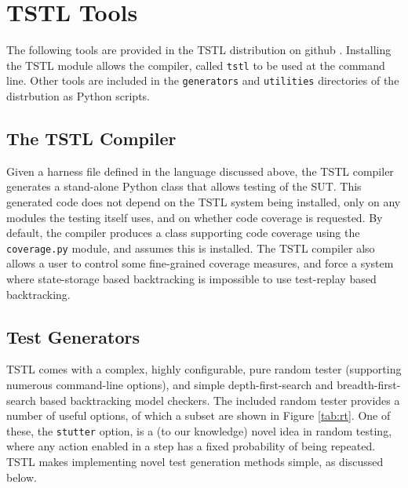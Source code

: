 \section{TSTL Tools}

The following tools are provided in the TSTL distribution on github \cite{tstl}.  Installing the TSTL module allows the compiler, called {\tt tstl} to be used at the command line.  Other tools are included in the {\tt generators} and {\tt utilities} directories of the distrbution as Python scripts.

\subsection{The TSTL Compiler}

Given a harness file defined in the language discussed above, the TSTL compiler generates a stand-alone Python class that allows testing of the SUT.  This generated code does not depend on the TSTL system being installed, only on any modules the testing itself uses, and on whether code coverage is requested.  By default, the compiler produces a class supporting code coverage using the {\tt coverage.py} module, and assumes this is installed.  The TSTL compiler also allows a user to control some fine-grained coverage measures, and force a system where state-storage based backtracking is impossible to use test-replay based backtracking.

\subsection{Test Generators}

TSTL comes with a complex, highly configurable, pure random tester (supporting numerous command-line options), and simple depth-first-search and breadth-first-search based backtracking model checkers.  The included random tester provides a number of useful options, of which a subset are shown in Figure \ref{tab:rt}.  One of these, the {\tt stutter} option, is a (to our knowledge) novel idea in random testing, where any action enabled in a step has a fixed probability of being repeated.  TSTL makes implementing novel test generation methods simple, as discussed below.

